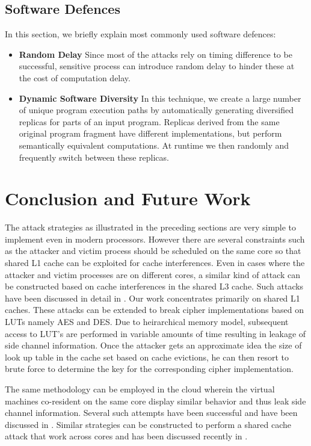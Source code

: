 \documentclass[twocolumn]{IEEEtran}
\begin{document}
\subsection {Software Defences}
In this section, we briefly explain most commonly used software defences:
\begin{itemize}
\item \textbf{Random Delay} Since most of the attacks rely on timing difference to be successful, sensitive process can introduce random delay to hinder these at the cost of computation delay.
\item \textbf{Dynamic Software Diversity}\cite{crane2015thwarting} In this technique, we create a large number of unique program execution paths by automatically generating diversified replicas for parts of an input program. Replicas derived from the same original program  fragment have different implementations, but perform semantically equivalent computations. At runtime we then randomly and frequently switch between these replicas.
\end{itemize}

\section {Conclusion and Future Work}

The attack strategies as illustrated in the preceding sections are very simple to implement even in modern processors. However there are several constraints such as  the attacker and victim process should be scheduled on the same core so that shared L1 cache can be exploited for cache interferences. Even in cases where the attacker and victim processes are on different cores, a similar kind of attack can be constructed  based on cache interferences in the shared L3 cache. Such attacks have been discussed in detail in \cite{sc2015lastlevel}. Our work concentrates primarily on shared L1 caches. These attacks can be extended to break cipher implementations based on LUTs namely AES and DES. Due to heirarchical memory model, subsequent access to LUT's are performed in variable amounts of time resulting in leakage of side channel information. Once the attacker gets an approximate idea the size of look up table in the cache set based on cache evictions, he can then resort to brute force to determine the key for the corresponding cipher implementation.

The same methodology can be employed in the cloud wherein the virtual machines co-resident on the same core display similar behavior and thus leak side channel information. Several such attempts have been successful and have been discussed in  \cite{sc2015lastlevel}.  Similar strategies can be constructed to perform a shared cache attack that work across cores and has been discussed recently in \cite{ir2015aes}.





\end{document}

